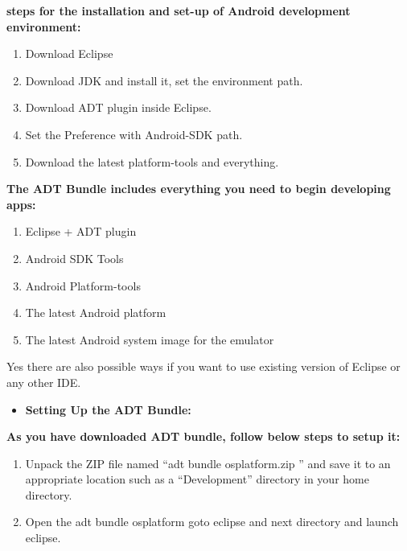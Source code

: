 {\bfseries steps for the installation and set-up of Android development environment:}
\begin{enumerate}
\item Download Eclipse
\item Download JDK and install it, set the environment path.
\item Download ADT plugin inside Eclipse.
\item Set the Preference with Android-SDK path.
\item Download the latest platform-tools and everything.
\end {enumerate}

{\bfseries The ADT Bundle includes everything you need to begin developing apps:}
\begin{enumerate}
\item Eclipse + ADT plugin
\item Android SDK Tools
\item Android Platform-tools
\item The latest Android platform
\item The latest Android system image for the emulator
\end {enumerate}

Yes there are also possible ways if you want to use existing version of Eclipse or any other IDE.

\begin{itemize}
\item{\bfseries Setting Up the ADT Bundle:}
\end{itemize}


{\bfseries As you have downloaded ADT bundle, follow below steps to setup it:}

\begin{enumerate}
\item Unpack the ZIP file named ``adt bundle osplatform.zip '' and save it to an appropriate location  such as a ``Development'' directory in your home directory.
\item Open the adt bundle osplatform goto eclipse and next directory and launch eclipse.
\end{enumerate}

